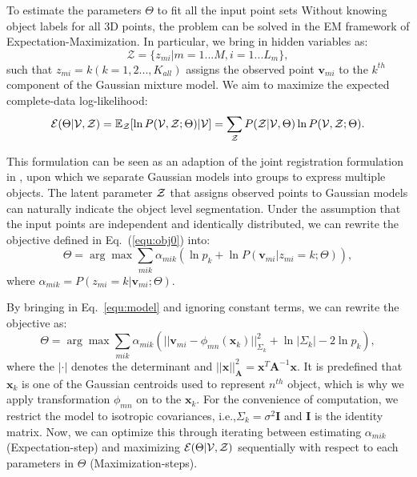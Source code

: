 To estimate the parameters $\Theta$ to fit all the input point sets Without knowing object labels for all 3D points, the problem can be solved in the EM framework of Expectation-Maximization. 
%
In particular, we bring in hidden variables as: 
\begin{equation}
\mathcal{Z}=\{z_{mi}|m=1...M,i=1...L_m\},
\end{equation}
%
such that $z_{mi}=k(k=1,2...,K_{all})$ assigns the observed point $\pmb{v}_{mi}$ to the $k^{th}$ component of the Gaussian mixture model. 
%
We aim to maximize the expected complete-data log-likelihood:
\begin{equation}
\label{equ:obj0}
\mathcal{E}(\Theta|\mathcal{V},\mathcal{Z})=\mathbb{E}_{\mathcal{Z}}[\ln P(\mathcal{V},\mathcal{Z};\Theta)|\mathcal{V}]={\sum_{\mathcal{Z}}P(\mathcal{Z}|\mathcal{V},\Theta)\ln{P(\mathcal{V},\mathcal{Z};\Theta)}}.
\end{equation}


This formulation can be seen as an adaption of the joint registration formulation in \cite{Evangelidis2014}, upon which we separate Gaussian models into groups to express multiple objects. 
%
The latent parameter $\mathcal{Z}$ that assigns observed points to Gaussian models can naturally indicate the object level segmentation.
%
Under the assumption that the input points are independent and identically distributed, we can rewrite the objective defined in Eq.~(\ref{equ:obj0}) into:
%
\begin{equation} \label{equ:obj2}
\Theta=\arg\max\sum_{mik}\alpha_{mik}(\ln p_k + \ln P(\pmb{v}_{mi}|z_{mi}=k;\Theta)),
\end{equation}
%
where $\alpha_{mik} = P( z_{mi} = k | \pmb{v}_{mi} ; \Theta )$.


By bringing in Eq.~\ref{equ:model} and ignoring constant terms, we can rewrite the objective as:
\begin{equation}
\label{equ:obj3}
\Theta=\arg\max\sum_{mik}\alpha_{mik}(||\pmb{v}_{mi}-\phi_{mn}(\pmb{x}_k)||_{\Sigma_k}^2 + \ln |\Sigma_k| - 2\ln p_k), 
\end{equation}
%
where the $|\cdot|$ denotes the determinant and $||\pmb{x}||_{\mathbf{A}}^2= \pmb{x}^T\mathbf{A}^{-1}\pmb{x}$. 
%
It is predefined that $\pmb{x}_k$ is one of the Gaussian centroids used to represent $n^{th}$ object, which is why we apply transformation $\phi_{mn}$ on to the $\pmb{x}_k$. 
%
For the convenience of computation, we restrict the model to isotropic covariances, i.e.,$\Sigma_k=\sigma^2\mathbf{I}$ and $\mathbf{I}$ is the identity matrix.
%
Now, we can optimize this through iterating between estimating $\alpha_{mik}$ (Expectation-step) and maximizing $\mathcal{E}(\Theta|\mathcal{V},\mathcal{Z})$ sequentially with respect to each parameters in $\Theta$ (Maximization-steps).

